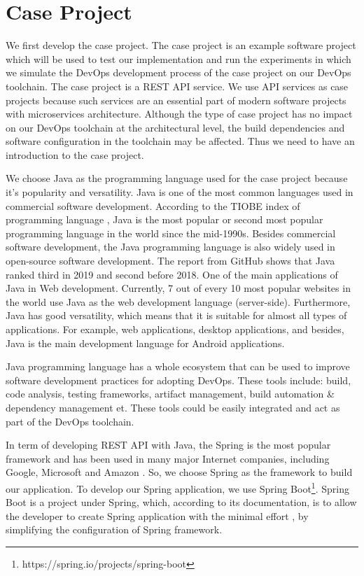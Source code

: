 \section{Case Project}
We first develop the case project. The case project is an example software project which will be used to test our implementation and run the experiments in which we simulate the DevOps development process of the case project on our DevOps toolchain. 
The case project is a REST API service. We use API services as case projects because such services are an essential part of modern software projects with microservices architecture. 
Although the type of case project has no impact on our DevOps toolchain at the architectural level, the build dependencies and software configuration in the toolchain may be affected. Thus we need to have an introduction to the case project.
\par
We choose Java as the programming language used for the case project because it's popularity and versatility.
Java is one of the most common languages used in commercial software development. According to the TIOBE index of programming language \cite{indexTIO42:online}, Java is the most popular or second most popular programming language in the world since the mid-1990s. Besides commercial software development, the Java programming language is also widely used in open-source software development. The report \cite{TheState3:online} from GitHub shows that Java ranked third in 2019 and second before 2018. One of the main applications of Java in Web development. Currently, 7 out of every 10 \cite{Programm17:online} most popular websites in the world use Java as the web development language (server-side). Furthermore, Java has good versatility, which means that it is suitable for almost all types of applications. For example, web applications, desktop applications, and besides, Java is the main development language for Android applications.
\par
Java programming language has a whole ecosystem that can be used to improve software development practices for adopting DevOps. These tools include: build, code analysis, testing frameworks, artifact management, build automation \& dependency management et. These tools could be easily integrated and act as part of the DevOps toolchain.
\par
In term of developing REST API with Java, the Spring is the most popular framework and has been used in many major Internet companies, including Google, Microsoft and Amazon \cite{SpringWh14:online}.
So, we choose Spring as the framework to build our application. To develop our Spring application, we use Spring Boot\footnote{https://spring.io/projects/spring-boot}. Spring Boot is a project under Spring, which, according to its documentation, is to allow the developer to create Spring application with the minimal effort \cite{SpringBo84:online}, by simplifying the configuration of Spring framework.
